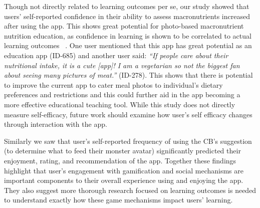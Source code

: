 

Though not directly related to learning outcomes per se, our study showed that users' self-reported confidence in their ability to assess macronutrients increased after using the app. This shows great potential for photo-based macronutrient nutrition education, as confidence in learning is shown to be correlated to actual learning outcomes ~\cite{badura1995exercise,choi2005self,de2013relationship,nicholson2013key,wesson2011self}. One user mentioned that this app has great potential as an education app (ID-685) and another user said: \textit{``If people care about their nutritional intake, it is a cute [app]! I am a vegetarian so not the biggest fan about seeing many pictures of meat.''} (ID-278).
This shows that there is potential to improve the current app to cater meal photos to individual's dietary preferences and restrictions and this could further aid in the app becoming a more effective educational teaching tool. 
While this study does not directly measure self-efficacy, future work should examine how user's self efficacy changes through interaction with the app. 

Similarly we saw that user's self-reported frequency of using the CB's suggestion (to determine what to feed their monster avatar) significantly predicted their enjoyment, rating, and recommendation of the app. 
Together these findings highlight that user's engagement with gamification and social mechanisms are important components to their overall experience using and enjoying the app. They also suggest more thorough research focused on learning outcomes is needed to understand exactly how these game mechanisms impact users' learning.  

